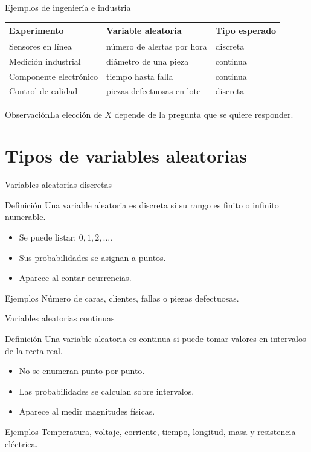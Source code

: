 \documentclass[aspectratio=169,11pt]{beamer}
\newcommand{\observacion}[1]{\begin{block}{Observación}#1\end{block}}
\begin{document}
\begin{frame}{Ejemplos de ingeniería e industria}
\small
\begin{tabular}{p{}p{}p{}}
\toprule
Experimento & Variable aleatoria & Tipo esperado \\
\midrule
Sensores en línea & número de alertas por hora & discreta \\
Medición industrial & diámetro de una pieza & continua \\
Componente electrónico & tiempo hasta falla & continua \\
Control de calidad & piezas defectuosas en lote & discreta \\
\bottomrule
\end{tabular}
\observacion{La elección de $X$ depende de la pregunta que se quiere responder.}
\end{frame}

\section{Tipos de variables aleatorias}

\begin{frame}{Variables aleatorias discretas}
\begin{block}{Definición}
Una variable aleatoria es discreta si su rango es finito o infinito numerable.
\end{block}
\begin{itemize}
  \item Se puede listar: $0,1,2,\ldots$.
  \item Sus probabilidades se asignan a puntos.
  \item Aparece al contar ocurrencias.
\end{itemize}
\begin{exampleblock}{Ejemplos}
Número de caras, clientes, fallas o piezas defectuosas.
\end{exampleblock}
\end{frame}

\begin{frame}{Variables aleatorias continuas}
\begin{block}{Definición}
Una variable aleatoria es continua si puede tomar valores en intervalos de la recta real.
\end{block}
\begin{itemize}
  \item No se enumeran punto por punto.
  \item Las probabilidades se calculan sobre intervalos.
  \item Aparece al medir magnitudes físicas.
\end{itemize}
\begin{exampleblock}{Ejemplos}
Temperatura, voltaje, corriente, tiempo, longitud, masa y resistencia eléctrica.
\end{exampleblock}
\end{frame}
\end{document}

